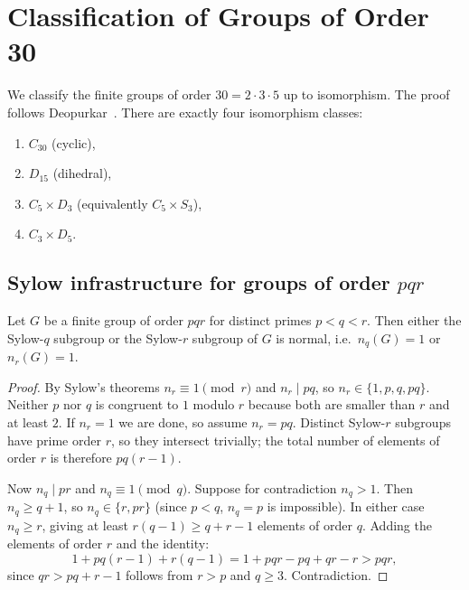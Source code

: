 


\section{Classification of Groups of Order 30}
\label{order-30-classification}

We classify the finite groups of order $30 = 2 \cdot 3 \cdot 5$ up to isomorphism.
The proof follows Deopurkar~\cite{deopurkar_modern_2013}.
There are exactly four isomorphism classes:
\begin{enumerate}
  \item $C_{30}$ (cyclic),
  \item $D_{15}$ (dihedral),
  \item $C_5 \times D_3$ (equivalently $C_5 \times S_3$),
  \item $C_3 \times D_5$.
\end{enumerate}

\subsection{Sylow infrastructure for groups of order \(pqr\)}

\begin{lemma}\label{pqr_normal_sylow}
Let $G$ be a finite group of order $pqr$ for distinct primes $p < q < r$.
Then either the Sylow-$q$ subgroup or the Sylow-$r$ subgroup of $G$ is normal,
i.e.\ $n_q(G) = 1$ or $n_r(G) = 1$.
\end{lemma}

\begin{proof}
By Sylow's theorems $n_r \equiv 1 \pmod r$ and $n_r \mid pq$, so $n_r \in \{1, p, q, pq\}$.
Neither $p$ nor $q$ is congruent to $1$ modulo $r$ because both are smaller than $r$
and at least $2$. If $n_r = 1$ we are done, so assume $n_r = pq$.
Distinct Sylow-$r$ subgroups have prime order $r$, so they intersect trivially;
the total number of elements of order $r$ is therefore $pq(r-1)$.

Now $n_q \mid pr$ and $n_q \equiv 1 \pmod q$. Suppose for contradiction $n_q > 1$.
Then $n_q \geq q + 1$, so $n_q \in \{r, pr\}$ (since $p < q$, $n_q = p$ is impossible).
In either case $n_q \geq r$, giving at least $r(q-1) \geq q+r-1$ elements of order $q$.
Adding the elements of order $r$ and the identity:
\[
1 + pq(r-1) + r(q-1) = 1 + pqr - pq + qr - r > pqr,
\]
since $qr > pq + r - 1$ follows from $r > p$ and $q \geq 3$. Contradiction.
\end{proof}

